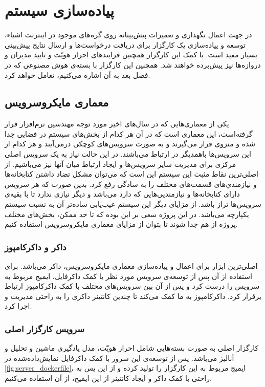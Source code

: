 \chapter{پیاده‌سازی سیستم}

در جهت اعمال نگهداری و تعمیرات پیش‌بینانه روی گره‌های موجود در اینترنت اشیاء، توسعه و پیاده‌سازی یک کارگزار برای دریافت درخواست‌ها و ارسال نتایج پیش‌بینی بسیار مفید است. با کمک این کارگزار همچنین فرایند‌های احراز هویّت و تایید مدیران و دروازه‌ها نیز پیش‌برده خواهند شد. همچنین این کارگزار با بسته‌ی هوش مصنوعی که در فصل بعد به آن اشاره می‌کنیم، تعامل خواهد کرد.


\section{معماری مایکروسرویس}
یکی از معماری‌هایی که در سال‌های اخیر مورد توجه مهندسین نرم‌افزار قرار گرفته‌است، این معماری است که در آن هر کدام از بخش‌های سیستم در فضایی جدا شده و منزوی قرار می‌گیرند
و به صورت سرویس‌های کوچکی درمی‌آیند و هر کدام از این سرویس‌ها باهمدیگر در ارتباط می‌باشند. در این حالت  نیاز به یک سرویس اصلی مرکزی برای مدیریت سایر سرویس‌ها و ایجاد ارتباط میان آنها نیز می‌باشیم. از اصلی‌ترین نقاط مثبت این سیستم این است که می‌توان مشکل تضاد داشتن کتابخانه‌ها و نیازمندي‌های قسمت‌های مختلف را به سادگی رفع کرد. بدین صورت که هر سرویس دارای کتابخانه‌ها و نیازمنديی‌هایی که دارد می‌باشد و دیگر نیازی ندارد تا با بقیه‌ی سرویس‌ها تراز باشد. از مزایای دیگر این سیستم عیب‌یابی ساده‌تر آن به نسبت سیستم یکپارچه می‌باشد\cite{thones2015microservices}. در این پروژه سعی بر این بوده که تا حد ممکن، بخش‌های مختلف پروژه از هم جدا شوند تا بتوان از مزایای معماری مایکرو‌سرویس استفاده کنیم.

\subsection{داکر و داکرکامپوز}
اصلی‌ترین ابزار برای اعمال و پیاده‌سازی معماری مایکروسرویس، داکر می‌باشد. برای استفاده از آن پس از توسعه‌ی سرویس مورد نظر با کمک داکرفایل، ایمیج مربوط به سرویس را درست کرد و پس از آن بین سرویس‌های مختلف با کمک داکرکامپوز ارتباط برقرار کرد. داکرکامپوز به ما کمک می‌کند تا چندین کانتینر داکری را به راحتی مدیریت و اجرا کرد.

\subsection{سرویس کارگزار اصلی}
کارگزار اصلی به صورت بسته‌هایی شامل احراز هویّت، مدل یادگیری ماشین و تحلیل و آنالیز می‌باشد. پس از توسعه‌ی این سرور با کمک داکرفایل نمایش‌داده‌شده در \cref{fig:server_dockerfile}، ایمیج مربوط به این کارگزار را تولید کرده و از این پس به راحتی با کمک داکر و ایجاد کانتینر از این ایمیج، از آن استفاده می‌کنیم.

